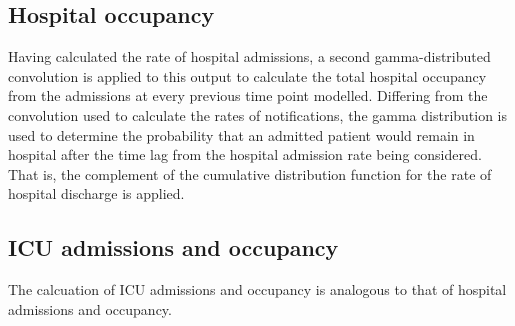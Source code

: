 \subsection{Hospital occupancy}
Having calculated the rate of hospital admissions,
a second gamma-distributed convolution is applied to this output to calculate
the total hospital occupancy from the admissions at every previous time point modelled.
Differing from the convolution used to calculate the rates of notifications,
the gamma distribution is used to determine the probability that an admitted patient
would remain in hospital after the time lag from the hospital admission rate being considered.
That is, the complement of the cumulative distribution function for the rate of hospital
discharge is applied.

\subsection{ICU admissions and occupancy}
The calcuation of ICU admissions and occupancy is analogous to that of hospital admissions and occupancy.
